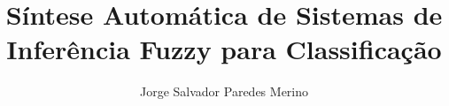 \documentclass[
  msc
]{ThesisPUC}
\author{Jorge Salvador Paredes Merino}
\title{Síntese Automática de Sistemas de Inferência Fuzzy para Classificação}
\begin{document}
  
  
  
  \arial
  
  \normalfont
  
\end{document}
